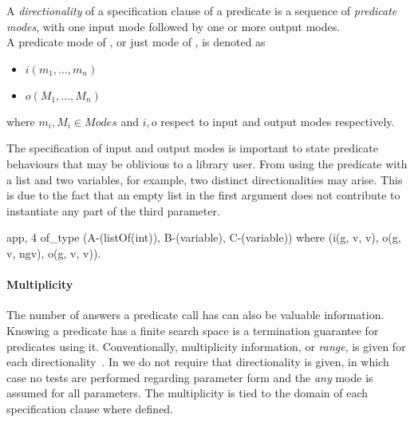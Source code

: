 \begin{definition}
\label{def:directionality}
A \emph{directionality} of a specification clause of a predicate
 is a sequence of \emph{predicate modes}, with one input mode
followed by one or more output modes.
\\
A predicate mode of , or just mode of , is denoted as
\begin{itemize}
  \item $i(m_1, ..., m_n)$
  \item $o(M_1, ..., M_n)$
\end{itemize}
where $m_i,M_i \in Modes$ and $i, o$ respect to input and output modes
respectively.
\end{definition}


The specification of input and output modes is important to state
predicate behaviours that may be oblivious to a library user.
%
From using the predicate  with a list and two variables, for
example, two distinct directionalities may arise.
%
This is due to the fact that an empty list in the first argument does
not contribute to instantiate any part of the third parameter.
%
\begin{yapcode}
 {app, 4} of_type (A-(listOf(int)), B-(variable), C-(variable))
    where (i(g, v, v), o(g, v, ngv), o(g, v, v)).
\end{yapcode}


\paragraph{\bf Multiplicity}
The number of answers a predicate call has can also be valuable
information.
%
Knowing a predicate has a finite search space is a termination
guarantee for predicates using it.
%
Conventionally, multiplicity information, or \emph{range}, is given for
each directionality~\cite{somogyi1995mercury}.
%
In \plqc{} we do not require that directionality is given, in which
case no tests are performed regarding parameter form and the \emph{any}
mode is assumed for all parameters.
%
The multiplicity is tied to the domain of each specification clause
where defined.


